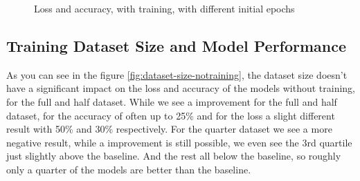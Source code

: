 \begin{figure}
\begin{subfigure}{0.5\textwidth}
    \end{subfigure}
    \caption{Loss and accuracy, with training, with different initial epochs}
    \label{fig:initial-epochs-training}
\end{figure}
\subsection{Training Dataset Size and Model Performance}\label{subsec:training-dataset-size-and-model-performance}
As you can see in the figure \ref{fig:dataset-size-notraining}, the dataset size doesn't have a significant impact on the loss and accuracy of the models without training, for the full and half dataset.
While we see a improvement for the full and half dataset, for the accuracy of often up to 25\% and for the loss a slight different result with 50\% and 30\% respectively.
For the quarter dataset we see a more negative result, while a improvement is still possible, we even see the 3rd quartile just slightly above the baseline.
And the rest all below the baseline, so roughly only a quarter of the models are better than the baseline.

